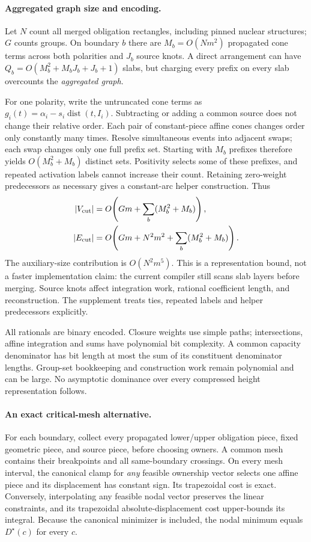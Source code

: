 \documentclass[10pt,letterpaper]{article}
\newcommand{\dist}{\operatorname{dist}}
\begin{document}
\paragraph{Aggregated graph size and encoding.}
Let $N$ count all merged obligation rectangles, including pinned nuclear structures; $G$ counts groups. On boundary $b$ there are $M_b=O(Nm^2)$ propagated cone terms across both polarities and $J_b$ source knots. A direct arrangement can have $Q_b=O(M_b^2+M_bJ_b+J_b+1)$ slabs, but charging every prefix on every slab overcounts the \emph{aggregated graph}.

For one polarity, write the untruncated cone terms as $g_i(t)=\alpha_i-s_i\dist(t,I_i)$. Subtracting or adding a common source does not change their relative order. Each pair of constant-piece affine cones changes order only constantly many times. Resolve simultaneous events into adjacent swaps; each swap changes only one full prefix set. Starting with $M_b$ prefixes therefore yields $O(M_b^2+M_b)$ distinct sets. Positivity selects some of these prefixes, and repeated activation labels cannot increase their count. Retaining zero-weight predecessors as necessary gives a constant-arc helper construction. Thus
\begin{align}
 |V_{\rm cut}|&=O\!\left(Gm+\sum_b(M_b^2+M_b)\right),\nonumber\\
 |E_{\rm cut}|&=O\!\left(Gm+N^2m^2+\sum_b(M_b^2+M_b)\right).\label{eq:size}
\end{align}
The auxiliary-size contribution is $O(N^2m^5)$. This is a representation bound, not a faster implementation claim: the current compiler still scans slab layers before merging. Source knots affect integration work, rational coefficient length, and reconstruction. The supplement treats ties, repeated labels and helper predecessors explicitly.

All rationals are binary encoded. Closure weights use simple paths; intersections, affine integration and sums have polynomial bit complexity. A common capacity denominator has bit length at most the sum of its constituent denominator lengths. Group-set bookkeeping and construction work remain polynomial and can be large. No asymptotic dominance over every compressed height representation follows.

\paragraph{An exact critical-mesh alternative.}
For each boundary, collect every propagated lower/upper obligation piece, fixed geometric piece, and source piece, before choosing owners. A common mesh contains their breakpoints and all same-boundary crossings. On every mesh interval, the canonical clamp for \emph{any} feasible ownership vector selects one affine piece and its displacement has constant sign. Its trapezoidal cost is exact. Conversely, interpolating any feasible nodal vector preserves the linear constraints, and its trapezoidal absolute-displacement cost upper-bounds its integral. Because the canonical minimizer is included, the nodal minimum equals $D^\star(c)$ for every $c$.
\end{document}
